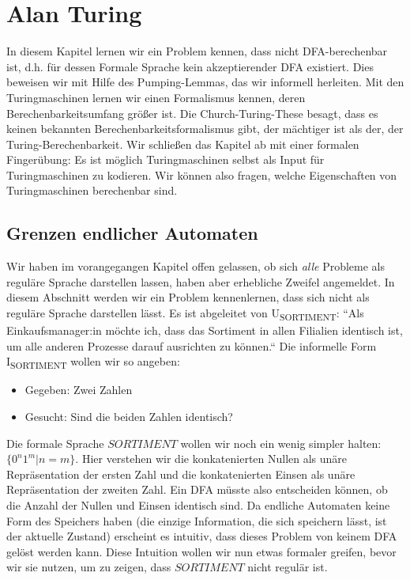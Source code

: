 \chapter{Alan Turing}\label{turing}

In diesem Kapitel lernen wir ein Problem kennen,
dass nicht DFA-berechenbar ist,
d.h. für dessen Formale Sprache kein akzeptierender DFA existiert.
Dies beweisen wir mit Hilfe des Pumping-Lemmas,
das wir informell herleiten.
Mit den Turingmaschinen lernen wir einen Formalismus kennen,
deren Berechenbarkeitsumfang größer ist.
Die Church-Turing-These besagt,
dass es keinen bekannten Berechenbarkeitsformalismus gibt,
der mächtiger ist als der, der Turing-Berechenbarkeit.
Wir schließen das Kapitel ab mit einer formalen Fingerübung:
Es ist möglich Turingmaschinen selbst als Input für Turingmaschinen zu kodieren.
Wir können also fragen, welche Eigenschaften von Turingmaschinen berechenbar sind.

\section{Grenzen endlicher Automaten}\label{pumping}
Wir haben im vorangegangen Kapitel offen gelassen,
ob sich \emph{alle} Probleme als reguläre Sprache darstellen lassen,
haben aber erhebliche Zweifel angemeldet.
In diesem Abschnitt werden wir ein Problem kennenlernen,
dass sich nicht als reguläre Sprache darstellen lässt.
Es ist abgeleitet von U\textsubscript{SORTIMENT}:
``Als Einkaufsmanager:in möchte ich,
dass das Sortiment in allen Filialien identisch ist,
um alle anderen Prozesse darauf ausrichten zu können.``
Die informelle Form 
I\textsubscript{SORTIMENT}
wollen wir so angeben:
\begin{itemize}
    \item Gegeben: Zwei Zahlen
    \item Gesucht: Sind die beiden Zahlen identisch?
\end{itemize}
Die formale Sprache $SORTIMENT$ wollen wir noch ein wenig simpler halten:
$\{0^n1^m|n=m\}$.
Hier verstehen wir die konkatenierten Nullen als unäre Repräsentation der ersten Zahl
und die konkatenierten Einsen als unäre Repräsentation der zweiten Zahl.
Ein DFA müsste also entscheiden können, ob die Anzahl der Nullen und Einsen identisch sind.
Da endliche Automaten keine Form des Speichers haben
(die einzige Information, die sich speichern lässt, ist der aktuelle Zustand)
erscheint es intuitiv, dass dieses Problem von keinem DFA gelöst werden kann.
Diese Intuition wollen wir nun etwas formaler greifen,
bevor wir sie nutzen, um zu zeigen, dass $SORTIMENT$ nicht regulär ist.

